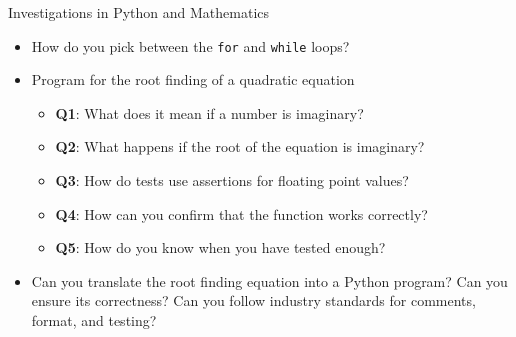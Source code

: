 \documentclass[14pt,aspectratio=169]{beamer}
\begin{document}
%
\begin{frame}{Investigations in Python and Mathematics}
  \begin{itemize}
    \item How do you pick between the {\tt for} and {\tt while} loops?
      \vspace*{-.15in}
    \item Program for the root finding of a quadratic equation
      \begin{itemize}
        \item {\bf Q1}: What does it mean if a number is imaginary?
        \item {\bf Q2}: What happens if the root of the equation is imaginary?
        \item {\bf Q3}: How do tests use assertions for floating point values?
        \item {\bf Q4}: How can you confirm that the function works correctly?
        \item {\bf Q5}: How do you know when you have tested enough?
      \end{itemize}
      \vspace*{-.2in}
    \item Can you translate the root finding equation into a Python program?
      Can you ensure its correctness? Can you follow industry standards for
      comments, format, and testing?
  \end{itemize}
\end{frame}
\end{document}
